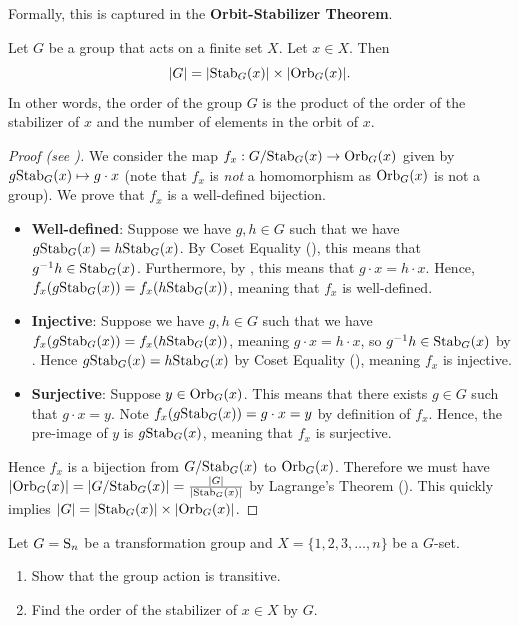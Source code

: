 Formally, this is captured in the \textbf{Orbit-Stabilizer Theorem}.
\begin{theorem}\label{thrm-orbit-stabilizer}
    Let $G$ be a group that acts on a finite set $X$. Let $x \in X$. Then
    \[
        |G| = |\mathrm{Stab}_{G}(x)| \times |\mathrm{Orb}_{G}(x)|.
    \]
    In other words, the order of the group $G$ is the product of the order of the stabilizer of $x$ and the number of elements in the orbit of $x$.
\end{theorem}

\begin{proof}[Proof (see {\cite[Theorem 10.16]{humphreys_1996}})]
    We consider the map $f_x: G/\mathrm{Stab}_{G}(x) \to \mathrm{Orb}_{G}(x)$ given by $g\mathrm{Stab}_{G}(x) \mapsto g \cdot x$ (note that $f_x$ is \textit{not} a homomorphism as $\mathrm{Orb}_{G}(x)$ is not a group). We prove that $f_x$ is a well-defined bijection.
    \begin{itemize}
        \item \textbf{Well-defined}: Suppose we have $g, h \in G$ such that we have $g\mathrm{Stab}_{G}(x) = h\mathrm{Stab}_{G}(x)$. By Coset Equality (), this means that $g^{-1}h \in \mathrm{Stab}_{G}(x)$. Furthermore, by , this means that $g\cdot x = h\cdot x$. Hence, $f_x(g\mathrm{Stab}_{G}(x)) = f_x(h\mathrm{Stab}_{G}(x))$, meaning that $f_x$ is well-defined.
        \item \textbf{Injective}: Suppose we have $g, h \in G$ such that we have $f_x(g\mathrm{Stab}_{G}(x)) = f_x(h\mathrm{Stab}_{G}(x))$, meaning $g\cdot x = h\cdot x$, so $g^{-1}h \in \mathrm{Stab}_{G}(x)$ by . Hence $g\mathrm{Stab}_{G}(x) = h\mathrm{Stab}_{G}(x)$ by Coset Equality (), meaning $f_x$ is injective.
        \item \textbf{Surjective}: Suppose $y \in \mathrm{Orb}_{G}(x)$. This means that there exists $g \in G$ such that $g\cdot x = y$. Note $f_x(g\mathrm{Stab}_{G}(x)) = g\cdot x = y$ by definition of $f_x$. Hence, the pre-image of $y$ is $g\mathrm{Stab}_{G}(x)$, meaning that $f_x$ is surjective.
    \end{itemize}
    Hence $f_x$ is a bijection from $G/\mathrm{Stab}_{G}(x)$ to $\mathrm{Orb}_{G}(x)$. Therefore we must have $|\mathrm{Orb}_{G}(x)| = |G/\mathrm{Stab}_{G}(x)| = \frac{|G|}{|\mathrm{Stab}_{G}(x)|}$ by Lagrange's Theorem (). This quickly implies $|G| = |\mathrm{Stab}_{G}(x)|\times|\mathrm{Orb}_{G}(x)|$.
\end{proof}

\begin{exercise}
    Let $G = \mathrm{S}_{n}$ be a transformation group and $X = \{1, 2, 3, \dots, n\}$ be a $G$-set.
    \begin{enumerate}[label=(\roman*)]
        \item Show that the group action is transitive.
        \item Find the order of the stabilizer of $x \in X$ by $G$.
    \end{enumerate}
\end{exercise}

